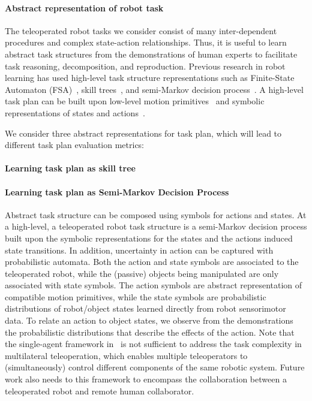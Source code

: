 \paragraph{Abstract representation of robot task} The teleoperated robot tasks we consider consist of many inter-dependent procedures and complex state-action relationships. Thus, it is useful to learn abstract task structures from the demonstrations of human experts to facilitate task reasoning, decomposition, and reproduction. Previous research in robot learning has used high-level task structure representations such as Finite-State Automaton (FSA)~\cite{niekum2013semantically}, skill trees~\cite{konidaris2012robot}, and semi-Markov decision process~\cite{konidaris2018skills}. A high-level task plan can be built upon low-level motion primitives~\cite{konidaris2012robot} and symbolic representations of states and actions~\cite{konidaris2018skills}. 

We consider three abstract representations for task plan, which will lead to different task plan evaluation metrics: 


\paragraph*{Learning task plan as skill tree}


\paragraph*{Learning task plan as Semi-Markov Decision Process} Abstract task structure can be composed using symbols for actions and states. At a high-level, a teleoperated robot task structure is a semi-Markov decision process built upon the symbolic representations for the states and the actions induced state transitions. In addition, uncertainty in action can be captured with probabilistic automata. Both the action and state symbols are associated to the teleoperated robot, while the (passive) objects being manipulated are only associated with state symbols. The action symbols are abstract representation of compatible motion primitives, while the state symbols are probabilistic distributions of robot/object states learned directly from robot sensorimotor data. To relate an action to object states, we observe from the demonstrations the probabilistic distributions that describe the effects of the action. Note that the single-agent framework in~\cite{konidaris2018skills} is not sufficient to address the task complexity in multilateral teleoperation, which enables multiple teleoperators to (simultaneously) control different components of the same robotic system. Future work also needs to this framework to encompass the collaboration between a teleoperated robot and remote human collaborator. 

